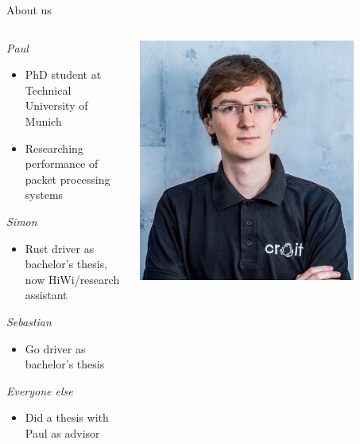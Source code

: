 \documentclass[NET,english,aspectratio=169,notitleframe]{tumbeamer}
\begin{document}
\begin{frame}{About us}
\begin{columns}
\begin{column}{0.8\textwidth}
\emph{Paul}
\begin{itemize}
\item PhD student at Technical University of Munich
\item Researching performance of packet processing systems
\end{itemize}
\vfill
\emph{Simon}
\begin{itemize}
\item Rust driver as bachelor's thesis, now HiWi/research assistant
\end{itemize}
\emph{Sebastian}
\begin{itemize}
\item Go driver as bachelor's thesis
\end{itemize}
\emph{Everyone else}
\begin{itemize}
\item Did a thesis with Paul as advisor
\end{itemize}
\end{column}
\begin{column}{0.15\textwidth}
\includegraphics[width=0.8\textwidth]{pics/paul.jpg}\\

\end{column}
\end{columns}
\end{frame}
\end{document}
